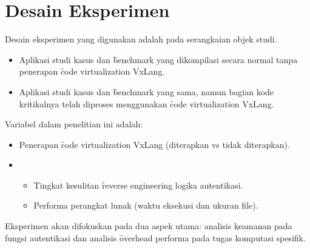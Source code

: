 \section{Desain Eksperimen}
Desain eksperimen yang digunakan adalah  pada serangkaian objek studi.
\begin{itemize}
    \item {} Aplikasi studi kasus dan \f{benchmark} yang dikompilasi secara normal tanpa penerapan \f{code virtualization} VxLang.
    \item {} Aplikasi studi kasus dan \f{benchmark} yang sama, namun bagian kode kritikalnya telah diproses menggunakan \f{code virtualization} VxLang.
\end{itemize}
Variabel dalam penelitian ini adalah:
\begin{itemize}
    \item {} Penerapan \f{code virtualization} VxLang (diterapkan vs tidak diterapkan).
    \item {}
        \begin{itemize}
            \item Tingkat kesulitan \f{reverse engineering} logika autentikasi.
            \item Performa perangkat lunak (waktu eksekusi dan ukuran file).
        \end{itemize}
\end{itemize}
Eksperimen akan difokuskan pada dua aspek utama: analisis keamanan pada fungsi autentikasi dan analisis \f{overhead} performa pada tugas komputasi spesifik.

